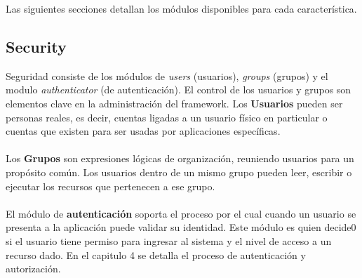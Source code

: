 \documentclass[conference, spanish]{IEEEtran}
\begin{document}
Las siguientes secciones detallan los módulos disponibles para cada característica. 

\subsection{Security}
Seguridad consiste de los módulos de \emph{users} (usuarios), \emph{groups} (grupos) y el modulo \emph{authenticator} (de autenticación). El control de los usuarios y grupos son elementos clave en la administración del framework. Los \textbf{Usuarios} pueden ser personas reales, es decir, cuentas ligadas a un usuario físico en particular o cuentas que existen para ser usadas por aplicaciones específicas. \\
\\
Los \textbf{Grupos} son expresiones lógicas de organización, reuniendo usuarios para un propósito común. Los usuarios dentro de un mismo grupo pueden leer, escribir o ejecutar los recursos que pertenecen a ese grupo.\\
\\
El módulo de \textbf{autenticación} soporta el proceso por el cual cuando un usuario se presenta a la aplicación puede validar su identidad. Este módulo es quien decide0 si el usuario tiene permiso para ingresar al sistema y el nivel de acceso a un recurso dado. En el capitulo 4 se detalla el proceso de autenticación y autorización.
\end{document}
